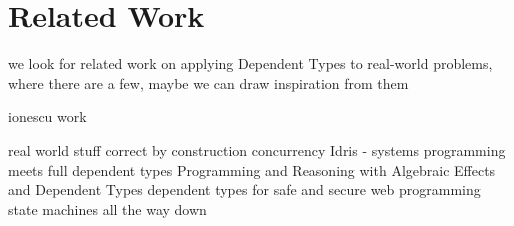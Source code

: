 \section{Related Work}
\label{sec:related_work}
we look for related work on applying Dependent Types to real-world problems, where there are a few, maybe we can draw inspiration from them

ionescu work
\cite{ionescu_dependently-typed_2012}
\cite{botta_functional_2011}

real world stuff
\cite{brady_correct-by-construction_2010} correct by construction concurrency
\cite{brady_idris_2011} Idris - systems programming meets full dependent types
\cite{brady_programming_2013} Programming and Reasoning with Algebraic Effects and Dependent Types 
\cite{fowler_dependent_2014} dependent types for safe and secure web programming
\cite{brady_state_2016} state machines all the way down